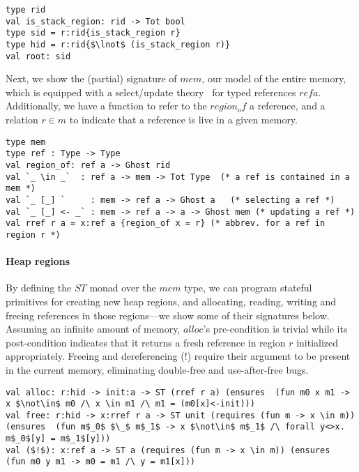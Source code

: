 \begin{lstlisting}[numbers=none]
type rid
val is_stack_region: rid -> Tot bool
type sid = r:rid{is_stack_region r}
type hid = r:rid{$\lnot$ (is_stack_region r)}
val root: sid
\end{lstlisting}

Next, we show the (partial) signature of \lst$mem$, our model of the
entire memory, which is equipped with a select/update
theory~\cite{mccarthy62} for typed references \lst$ref a$.
Additionally, we have a function to refer to the
\lst$region_of$ a reference, and a relation \lst$r \in m$ to indicate
that a reference is live in a given memory.

\begin{lstlisting}[numbers=none]
type mem
type ref : Type -> Type
val region_of: ref a -> Ghost rid
val `_ \in _`  : ref a -> mem -> Tot Type  (* a ref is contained in a mem *)
val `_ [_] `     : mem -> ref a -> Ghost a   (* selecting a ref *)
val `_ [_] <- _` : mem -> ref a -> a -> Ghost mem (* updating a ref *)
val rref r a = x:ref a {region_of x = r} (* abbrev. for a ref in region r *)
\end{lstlisting}

\paragraph*{Heap regions} By defining the \lst$ST$ monad
over the \lst$mem$ type, we can program stateful primitives for creating
new heap regions, and allocating, reading,
writing and freeing references in those regions---we show some of
their signatures below. Assuming an infinite amount of memory,
\lst$alloc$'s pre-condition is trivial while its post-condition
indicates that it returns a fresh reference in region \lst$r$
initialized appropriately.  Freeing and dereferencing ($!$) require their
argument to be present in the current memory, eliminating double-free
and use-after-free bugs.


\begin{lstlisting}[numbers=none]
val alloc: r:hid -> init:a -> ST (rref r a) (ensures  (fun m0 x m1 -> x $\not\in$ m0 /\ x \in m1 /\ m1 = (m0[x]<-init)))
val free: r:hid -> x:rref r a -> ST unit (requires (fun m -> x \in m)) (ensures  (fun m$_0$ $\_$ m$_1$ -> x $\not\in$ m$_1$ /\ forall y<>x. m$_0$[y] = m$_1$[y]))
val ($!$): x:ref a -> ST a (requires (fun m -> x \in m)) (ensures  (fun m0 y m1 -> m0 = m1 /\ y = m1[x]))
\end{lstlisting}

